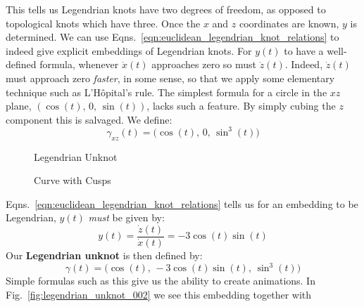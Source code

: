     This tells us Legendrian knots have two degrees of freedom, as opposed to
    topological knots which have three. Once the $x$ and $z$ coordinates are
    known, $y$ is determined. We can use
    Eqns.~\ref{eqn:euclidean_legendrian_knot_relations} to indeed give explicit
    embeddings of Legendrian knots. For $y(t)$ to have a well-defined formula,
    whenever $\dot{x}(t)$ approaches zero so must $\dot{z}(t)$. Indeed,
    $\dot{z}(t)$ must approach zero \textit{faster}, in some sense, so that
    we apply some elementary technique such as L'H\^{o}pital's rule. The
    simplest formula for a circle in the $xz$ plane,
    $(\cos(t),\,0,\,\sin(t))$, lacks such a feature. By simply
    cubing the $z$ component this is salvaged. We define:
    \begin{equation}
        \gamma_{xz}(t)=\big(\cos(t),\,0,\,\sin^{3}(t)\big)
    \end{equation}
    \begin{figure}
        \centering
        \begin{minipage}[b]{0.49\textwidth}
            \centering
            \caption{Legendrian Unknot}
            \label{fig:legendrian_unknot_002}
        \end{minipage}
        \hfill
        \begin{minipage}[b]{0.49\textwidth}
            \centering
            \vspace{2em}
            \caption{Curve with Cusps}
            \label{fig:cusps_in_the_plane_001}
        \end{minipage}
    \end{figure}
    Eqns.~\ref{eqn:euclidean_legendrian_knot_relations} tells us for an
    embedding to be Legendrian, $y(t)$ \textit{must} be given by:
    \begin{equation}
        y(t)=\frac{\dot{z}(t)}{\dot{x}(t)}=-3\cos(t)\sin(t)
    \end{equation}
    Our \textbf{Legendrian unknot} is then defined by:
    \begin{equation}
        \gamma(t)=\big(
            \cos(t),\,
            -3\cos(t)\sin(t),\,
            \sin^{3}(t)
        \big)
    \end{equation}
    Simple formulas such as this give us the ability to create animations. In
    Fig.~\ref{fig:legendrian_unknot_002} we see this embedding together with
